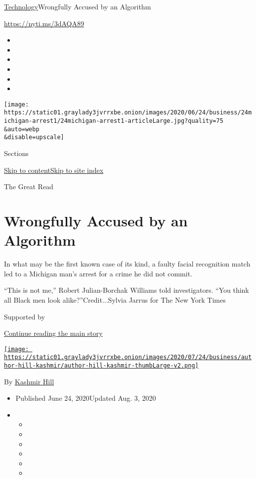 \href{/section/technology}{Technology}\textbar{}Wrongfully Accused by an
Algorithm

\url{https://nyti.ms/3dAQA89}

\begin{itemize}
\item
\item
\item
\item
\item
\item
\end{itemize}

\texttt{[image: https://static01.graylady3jvrrxbe.onion/images/2020/06/24/business/24michigan-arrest1/24michigan-arrest1-articleLarge.jpg?quality=75\\\&auto=webp\\\&disable=upscale]}

Sections

\protect\hyperlink{site-content}{Skip to
content}\protect\hyperlink{site-index}{Skip to site index}

The Great Read

\hypertarget{wrongfully-accused-by-an-algorithm}{%
\section{Wrongfully Accused by an
Algorithm}\label{wrongfully-accused-by-an-algorithm}}

In what may be the first known case of its kind, a faulty facial
recognition match led to a Michigan man's arrest for a crime he did not
commit.

``This is not me,'' Robert Julian-Borchak Williams told investigators.
``You think all Black men look alike?''Credit...Sylvia Jarrus for The
New York Times

Supported by

\protect\hyperlink{after-sponsor}{Continue reading the main story}

\href{https://www.nytimes3xbfgragh.onion/by/kashmir-hill}{\texttt{[image: https://static01.graylady3jvrrxbe.onion/images/2020/07/24/business/author-hill-kashmir/author-hill-kashmir-thumbLarge-v2.png]}}

By \href{https://www.nytimes3xbfgragh.onion/by/kashmir-hill}{Kashmir
Hill}

\begin{itemize}
\item
  Published June 24, 2020Updated Aug. 3, 2020
\item
  \begin{itemize}
  \item
  \item
  \item
  \item
  \item
  \item
  \end{itemize}
\end{itemize}

